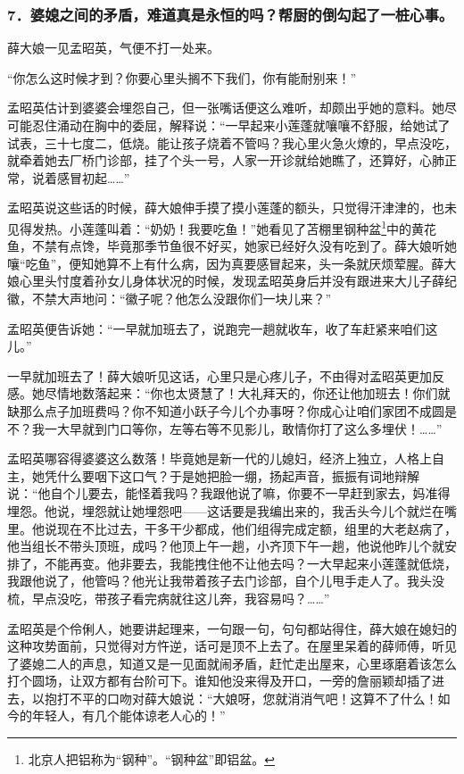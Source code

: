 \subsubsection*{7．婆媳之间的矛盾，难道真是永恒的吗？帮厨的倒勾起了一桩心事。}
\par 薛大娘一见孟昭英，气便不打一处来。
\par “你怎么这时候才到？你要心里头搁不下我们，你有能耐别来！”
\par 孟昭英估计到婆婆会埋怨自己，但一张嘴话便这么难听，却颇出乎她的意料。她尽可能忍住涌动在胸中的委屈，解释说：“一早起来小莲蓬就嚷嚷不舒服，给她试了试表，三十七度二，低烧。能让孩子烧着不管吗？我心里火急火燎的，早点没吃，就牵着她去厂桥门诊部，挂了个头一号，人家一开诊就给她瞧了，还算好，心肺正常，说着感冒初起……”
\par 孟昭英说这些话的时候，薛大娘伸手摸了摸小莲蓬的额头，只觉得汗津津的，也未见得发热。小莲蓬叫着：“奶奶！我要吃鱼！”她看见了苫棚里钢种盆\footnote{北京人把铝称为“钢种”。“钢种盆”即铝盆。}中的黄花鱼，不禁有点馋，毕竟那季节鱼很不好买，她家已经好久没有吃到了。薛大娘听她嚷“吃鱼”，便知她算不上有什么病，因为真要感冒起来，头一条就厌烦荤腥。薛大娘心里头忖度着孙女儿身体状况的时候，发现孟昭英身后并没有跟进来大儿子薛纪徽，不禁大声地问：“徽子呢？他怎么没跟你们一块儿来？”
\par 孟昭英便告诉她：“一早就加班去了，说跑完一趟就收车，收了车赶紧来咱们这儿。”
\par 一早就加班去了！薛大娘听见这话，心里只是心疼儿子，不由得对孟昭英更加反感。她尽情地数落起来：“你也太贤慧了！大礼拜天的，你还让他加班去！你们就缺那么点子加班费吗？你不知道小跃子今儿个办事呀？你成心让咱们家团不成圆是不？我一大早就到门口等你，左等右等不见影儿，敢情你打了这么多埋伏！……”
\par 孟昭英哪容得婆婆这么数落！毕竟她是新一代的儿媳妇，经济上独立，人格上自主，她凭什么要咽下这口气？于是她把脸一绷，扬起声音，振振有词地辩解说：“他自个儿要去，能怪着我吗？我跟他说了嘛，你要不一早赶到家去，妈准得埋怨。他说，埋怨就让她埋怨吧——这话要是我编出来的，我舌头今儿个就烂在嘴里。他说现在不比过去，干多干少都成，他们组得完成定额，组里的大老赵病了，他当组长不带头顶班，成吗？他顶上午一趟，小齐顶下午一趟，他说他昨儿个就安排了，不能再变。他非要去，我能拽住他不让他去吗？一大早起来小莲蓬就低烧，我跟他说了，他管吗？他光让我带着孩子去门诊部，自个儿甩手走人了。我头没梳，早点没吃，带孩子看完病就往这儿奔，我容易吗？……”
\par 孟昭英是个伶俐人，她要讲起理来，一句跟一句，句句都站得住，薛大娘在媳妇的这种攻势面前，只觉得对方忤逆，话可是顶不上去了。在屋里呆着的薛师傅，听见了婆媳二人的声息，知道又是一见面就闹矛盾，赶忙走出屋来，心里琢磨着该怎么打个圆场，让双方都有台阶可下。谁知他没来得及开口，一旁的詹丽颖却插了进去，以抱打不平的口吻对薛大娘说：“大娘呀，您就消消气吧！这算不了什么！如今的年轻人，有几个能体谅老人心的！”
